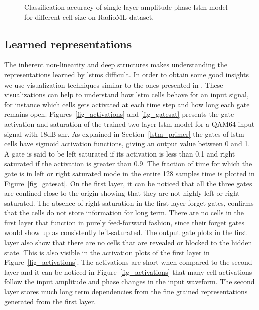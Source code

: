 \begin{figure}[htb]
\caption{Classification accuracy of single layer amplitude-phase \ac{lstm} model for different cell size on RadioML dataset.}
\label{fig_depth_1}
\end{figure}

\subsection{Learned representations}

The inherent non-linearity and deep structures makes understanding the representations learned by \ac{lstm}s difficult. In order to obtain some good insights we use visualization techniques similar to the ones presented in \cite{vis_karpathy}. These visualizations can help to understand how \ac{lstm} cells behave for an input signal, for instance which cells gets activated at each time step and how long each gate remains open. Figures~\ref{fig_activations} and \ref{fig_gatesat} presents the gate activation and saturation of the trained two layer \ac{lstm} model for a QAM64 input signal with 18dB \ac{snr}. As explained in Section~\ref{lstm_primer} the gates of \ac{lstm} cells have sigmoid activation functions, giving an output value between 0 and 1. A gate is said to be left saturated if its activation is less than 0.1 and right saturated if the activation is greater than 0.9. The fraction of time for which the gate is in left or right saturated mode in the entire 128 samples time is plotted in Figure~\ref{fig_gatesat}. On the first layer, it can be noticed that all the three gates are confined close to the origin showing that they are not highly left or right saturated. The absence of right saturation in the first layer forget gates, confirms that the cells do not store information for long term. There are no cells in the first layer that function in purely feed-forward fashion, since their forget gates would show up as consistently left-saturated. The output gate plots in the first layer also show that there are no cells that are revealed or blocked to the hidden state. This is also visible in the activation plots of the first layer in Figure~\ref{fig_activations}. The activations are short when compared to the second layer and it can be noticed in Figure~\ref{fig_activations} that many cell activations follow the input amplitude and phase changes in the input waveform. The second layer stores much long term dependencies from the fine grained representations generated from the first layer. 


